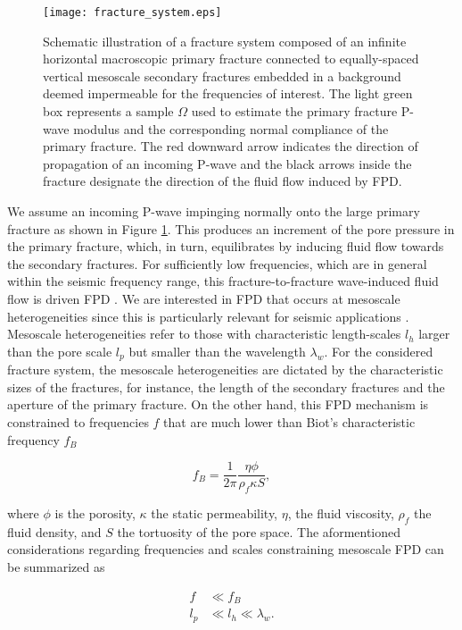 \documentclass[draft]{agujournal2019}
\begin{document}
 \begin{figure}[!ht]
\centering
        \texttt{[image: fracture\_system.eps]}
\caption{ Schematic illustration of a fracture system composed of an infinite horizontal macroscopic primary fracture connected to equally-spaced vertical mesoscale secondary fractures embedded in a background deemed impermeable for the frequencies of interest. The light green box represents a sample $\Omega$ used to estimate the primary fracture P-wave modulus and the corresponding normal compliance of the primary fracture. The red downward arrow indicates the direction of propagation of an incoming P-wave and the black arrows inside the fracture designate the direction of the fluid flow induced by FPD.
}
\label{fig.1}
\end{figure}

We assume an incoming P-wave impinging normally onto the large primary fracture as shown  in Figure \ref{fig.1}. This produces an increment of the pore pressure in the primary fracture, which, in turn, equilibrates by inducing fluid flow towards the secondary fractures. For sufficiently low frequencies, which are in general within the seismic frequency range, this fracture-to-fracture wave-induced fluid flow is driven FPD \cite{Muller2010}.
We are interested in FPD that occurs at mesoscale heterogeneities since this is particularly relevant for seismic applications \cite{Pride2004, Muller2010}.
Mesoscale heterogeneities refer to those with characteristic length-scales  $l_h$ larger than the pore scale $l_p$ but smaller than the wavelength $\lambda_w$. For the considered fracture system, the mesoscale heterogeneities are dictated by the characteristic sizes of the fractures, for instance, the length of the secondary fractures \cite{Rubino2014} and the aperture of the primary fracture.
On the other hand, this FPD  mechanism is constrained to frequencies $f$ that are much lower than Biot's characteristic frequency $f_B$  \cite{Biot1956, Dutta1979}
\begin{linenomath*}
\begin{equation}\label{Eq.1}
f_B= \frac{1}{2 \pi} \frac{\eta \phi}{ \rho_f \kappa S },
\end{equation}
\end{linenomath*}
where $\phi$ is the porosity, $\kappa$  the static permeability, $\eta$, the fluid viscosity,  $\rho_f$ the fluid density, and $S$ the tortuosity of the pore space. The aformentioned considerations regarding frequencies and scales constraining mesoscale FPD can be summarized as
\begin{linenomath*}
\begin{equation}\label{Eq.2}
\begin{split}
f & \ll f_B\\
l_p & \ll l_h\ll \lambda_w.
\end{split}
\end{equation}
\end{linenomath*}
\end{document}
